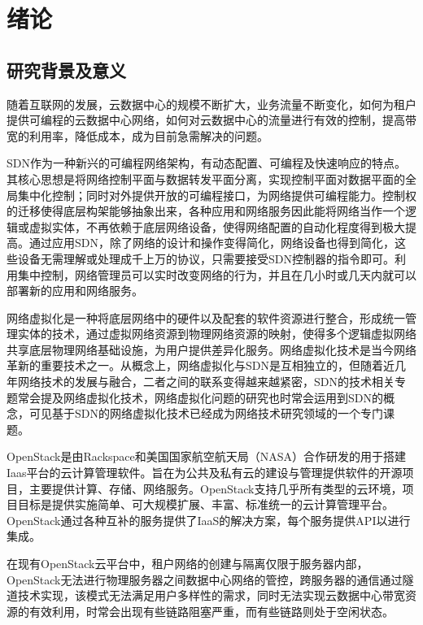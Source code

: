 
\chapter{绪论}
\section{研究背景及意义}
随着互联网的发展，云数据中心的规模不断扩大，业务流量不断变化，如何为租户提供可编程的云数据中心网络，如何对云数据中心的流量进行有效的控制，提高带宽的利用率，降低成本，成为目前急需解决的问题。

\gls*{SDN}作为一种新兴的可编程网络架构，有动态配置、可编程及快速响应的特点。其核心思想是将网络控制平面与数据转发平面分离，实现控制平面对数据平面的全局集中化控制；同时对外提供开放的可编程接口，为网络提供可编程能力。控制权的迁移使得底层构架能够抽象出来，各种应用和网络服务因此能将网络当作一个逻辑或虚拟实体，不再依赖于底层网络设备\cite{SDN-1}，使得网络配置的自动化程度得到极大提高。通过应用SDN，除了网络的设计和操作变得简化，网络设备也得到简化，这些设备无需理解或处理成千上万的协议，只需要接受SDN控制器的指令即可。利用集中控制，网络管理员可以实时改变网络的行为，并且在几小时或几天内就可以部署新的应用和网络服务。

网络虚拟化\cite{Virtual-1}是一种将底层网络中的硬件以及配套的软件资源进行整合，形成统一管理实体的技术，通过虚拟网络资源到物理网络资源的映射，使得多个逻辑虚拟网络共享底层物理网络基础设施，为用户提供差异化服务。网络虚拟化技术是当今网络革新的重要技术之一。从概念上，网络虚拟化与SDN是互相独立的，但随着近几年网络技术的发展与融合，二者之间的联系变得越来越紧密，SDN的技术相关专题常会提及网络虚拟化技术，网络虚拟化问题的研究也时常会运用到SDN的概念，可见基于SDN的网络虚拟化技术已经成为网络技术研究领域的一个专门课题。

OpenStack\cite{OpenStack-1}是由Rackspace和美国国家航空航天局（NASA）合作研发的用于搭建Iaas平台的云计算管理软件。旨在为公共及私有云的建设与管理提供软件的开源项目，主要提供计算、存储、网络服务。OpenStack支持几乎所有类型的云环境，项目目标是提供实施简单、可大规模扩展、丰富、标准统一的云计算管理平台。OpenStack通过各种互补的服务提供了\gls*{IaaS}的解决方案，每个服务提供API以进行集成\cite{OpenStack-2}。

在现有OpenStack云平台中，租户网络的创建与隔离仅限于服务器内部，OpenStack无法进行物理服务器之间数据中心网络的管控，跨服务器的通信通过隧道技术实现，该模式无法满足用户多样性的需求，同时无法实现云数据中心带宽资源的有效利用，时常会出现有些链路阻塞严重，而有些链路则处于空闲状态。

